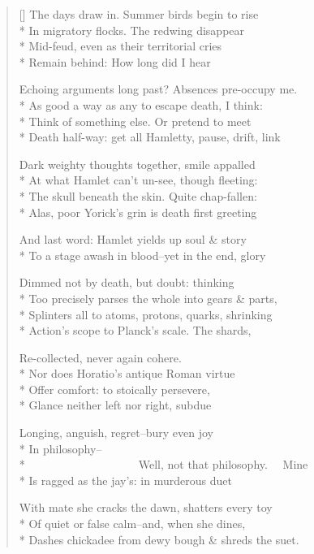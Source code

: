 \label{ch:alas_poor_hamlet}
\settowidth{\versewidth}{                       Well, not that philosophy.   Mine}
\begin{verse}[\versewidth]
The days draw in. Summer birds begin to rise\\*
In migratory flocks. The redwing disappear\\*
Mid-feud, even as their territorial cries\\*
Remain behind: How long did I hear

Echoing arguments long past? Absences pre-occupy me.\\*
As good a way as any to escape death, I think:\\*
Think of something else. Or pretend to meet\\*
Death half-way: get all Hamletty, pause, drift, link

Dark weighty thoughts together, smile appalled\\*
At what Hamlet can't un-see, though fleeting:\\*
The skull beneath the skin. Quite chap-fallen:\\*
Alas, poor Yorick's grin is death first greeting

And last word: Hamlet yields up soul \& story\\*
To a stage awash in blood--yet in the end, glory

Dimmed not by death, but doubt: thinking\\*
Too precisely parses the whole into gears \& parts,\\*
Splinters all to atoms, protons, quarks, shrinking\\*
Action's scope to Planck's scale. The shards,

Re-collected, never again cohere.\\*
Nor does Horatio's antique Roman virtue\\*
Offer comfort: to stoically persevere,\\*
Glance neither left nor right, subdue

Longing, anguish, regret--bury even joy\\*
In philosophy--\\*
                       Well, not that philosophy.   Mine\\*
Is ragged as the jay's: in murderous duet

With mate she cracks the dawn, shatters every toy\\*
Of quiet or false calm--and, when she dines,\\*
Dashes chickadee from dewy bough \& shreds the suet.
\end{verse}
